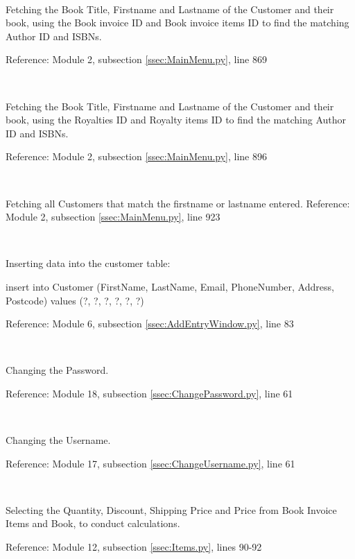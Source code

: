 \

Fetching the Book Title, Firstname and Lastname of the Customer and their book, using the Book invoice ID and Book invoice items ID to find the matching Author ID and ISBNs.
\begin{tiny}
\end{tiny}
Reference: Module 2,  subsection \ref{ssec:MainMenu.py}, line 869

\

Fetching the Book Title, Firstname and Lastname of the Customer and their book, using the Royalties ID and Royalty items ID to find the matching Author ID and ISBNs.
\begin{tiny}
\end{tiny}
Reference: Module 2,  subsection \ref{ssec:MainMenu.py}, line 896

\

Fetching all Customers that match the firstname or lastname entered.
Reference: Module 2,  subsection \ref{ssec:MainMenu.py}, line 923

\

Inserting data into the customer table:
\begin{sql}
insert into Customer 
(FirstName, LastName, Email, PhoneNumber, Address, Postcode) 
values (?, ?, ?, ?, ?, ?)
\end{sql}
Reference: Module 6,  subsection \ref{ssec:AddEntryWindow.py}, line 83

\

Changing the Password.
\begin{tiny}
\end{tiny}
Reference: Module 18,  subsection \ref{ssec:ChangePassword.py}, line 61

\

Changing the Username.
\begin{small}
\end{small}
Reference: Module 17,  subsection \ref{ssec:ChangeUsername.py}, line 61

\

Selecting the Quantity, Discount, Shipping Price and Price from Book Invoice Items and Book, to conduct calculations.
\begin{tiny}
\end{tiny}
Reference: Module 12,  subsection \ref{ssec:Items.py}, lines 90-92

